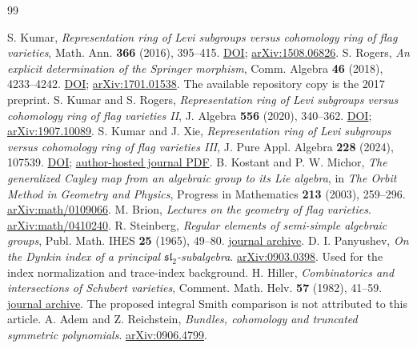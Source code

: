 \clearpage
\begin{thebibliography}{99}
\small\raggedright
\setlength{\itemsep}{0pt}\setlength{\parskip}{0pt}
 S. Kumar, \emph{Representation ring of Levi subgroups versus cohomology ring of flag varieties}, Math. Ann. \textbf{366} (2016), 395--415. \href{https://doi.org/10.1007/s00208-015-1325-6}{DOI}; \href{https://arxiv.org/abs/1508.06826}{arXiv:1508.06826}.
 S. Rogers, \emph{An explicit determination of the Springer morphism}, Comm. Algebra \textbf{46} (2018), 4233--4242. \href{https://doi.org/10.1080/00927872.2017.1407418}{DOI}; \href{https://arxiv.org/abs/1701.01538}{arXiv:1701.01538}. The available repository copy is the 2017 preprint.
 S. Kumar and S. Rogers, \emph{Representation ring of Levi subgroups versus cohomology ring of flag varieties II}, J. Algebra \textbf{556} (2020), 340--362. \href{https://doi.org/10.1016/j.jalgebra.2020.02.029}{DOI}; \href{https://arxiv.org/abs/1907.10089}{arXiv:1907.10089}.
 S. Kumar and J. Xie, \emph{Representation ring of Levi subgroups versus cohomology ring of flag varieties III}, J. Pure Appl. Algebra \textbf{228} (2024), 107539. \href{https://doi.org/10.1016/j.jpaa.2023.107539}{DOI}; \href{https://kumar.math.unc.edu/papers/kumar86.pdf}{author-hosted journal PDF}.
 B. Kostant and P. W. Michor, \emph{The generalized Cayley map from an algebraic group to its Lie algebra}, in \emph{The Orbit Method in Geometry and Physics}, Progress in Mathematics \textbf{213} (2003), 259--296. \href{https://arxiv.org/abs/math/0109066}{arXiv:math/0109066}.
 M. Brion, \emph{Lectures on the geometry of flag varieties}. \href{https://arxiv.org/abs/math/0410240}{arXiv:math/0410240}.
 R. Steinberg, \emph{Regular elements of semi-simple algebraic groups}, Publ. Math. IHES \textbf{25} (1965), 49--80. \href{https://www.numdam.org/item/PMIHES_1965__25__49_0/}{journal archive}.
 D. I. Panyushev, \emph{On the Dynkin index of a principal $\mathfrak{sl}_2$-subalgebra}. \href{https://arxiv.org/abs/0903.0398}{arXiv:0903.0398}. Used for the index normalization and trace-index background.
 H. Hiller, \emph{Combinatorics and intersections of Schubert varieties}, Comment. Math. Helv. \textbf{57} (1982), 41--59. \href{https://www.e-periodica.ch/cntmng?pid=com-001:1982:57::10}{journal archive}. The proposed integral Smith comparison is not attributed to this article.
 A. Adem and Z. Reichstein, \emph{Bundles, cohomology and truncated symmetric polynomials}. \href{https://arxiv.org/abs/0906.4799}{arXiv:0906.4799}.

\end{thebibliography}
